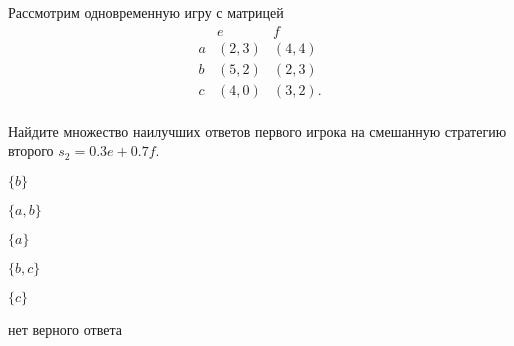 
\begin{question}
Рассмотрим одновременную игру с матрицей
\[
\begin{matrix}
   & e & f \\
a  & (2, 3) & (4, 4) \\
b  & (5, 2) & (2, 3) \\ 
c  & (4, 0) & (3, 2). \\ 
\end{matrix}
\]

Найдите множество наилучших ответов первого игрока на смешанную стратегию второго \(s_2 = 0.3e + 0.7f\).
\begin{answerlist}
  \item \(\{b\}\)
  \item \(\{a, b\}\)
  \item \(\{a\}\)
  \item \(\{b, c\}\)
  \item \(\{c\}\)
  \item нет верного ответа
\end{answerlist}
\end{question}


